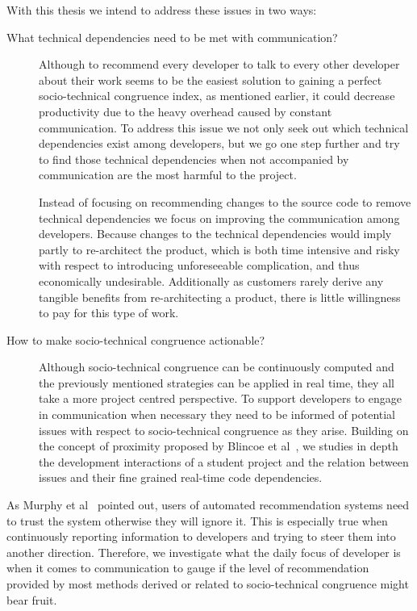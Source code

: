 With this thesis we intend to address these issues in two ways:
\begin{description}
\item[What technical dependencies need to be met with communication?] 
Although to recommend every developer to talk to every other developer about their work seems to be the easiest solution to gaining a perfect socio-technical congruence index, as mentioned earlier, it could decrease productivity due to the heavy overhead caused by  constant communication.
To address this issue we not only seek out which technical dependencies exist among developers, but we go one step further and try to find those technical dependencies when not accompanied by communication are the most harmful to the project.

Instead of focusing on recommending changes to the source code to remove technical dependencies we focus on improving the communication among developers.
Because changes to the technical dependencies would imply partly to re-architect the product, which is both time intensive and risky with respect to introducing unforeseeable complication, and thus economically undesirable.
Additionally as customers rarely derive any tangible benefits from re-architecting a product, there is little willingness to pay for this type of work.

\item[How to make socio-technical congruence actionable?] Although socio-technical congruence can be continuously computed and the previously mentioned strategies can be applied in real time, they all take a more project centred perspective.
To support developers to engage in communication when necessary they need to be informed of potential issues with respect to socio-technical congruence as they arise.
Building on the concept of proximity proposed by Blincoe et al~\cite{blincoe:cscw:2012}, we studies in depth the development interactions of a student project and the relation between issues and their fine grained real-time code dependencies.
\end{description}

As Murphy et al~\cite{murphy:rsse:2010} pointed out, users of automated recommendation systems need to trust the system otherwise they will ignore it.
This is especially true when continuously reporting information to developers and trying to steer them into another direction.
Therefore, we investigate what the daily focus of developer is when it comes to communication to gauge if the level of recommendation provided by most methods derived or related to socio-technical congruence might bear fruit.

